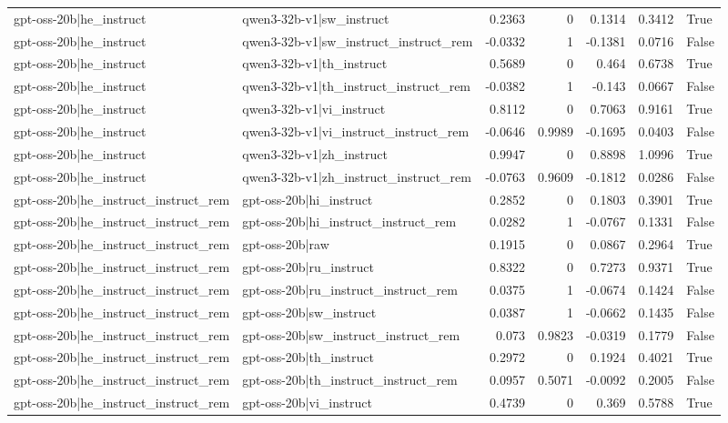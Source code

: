 \begin{table}
\begin{tabular}{l l r r r r l}
gpt-oss-20b|he_instruct & qwen3-32b-v1|sw_instruct & 0.2363 & 0 & 0.1314 & 0.3412 & True \\
gpt-oss-20b|he_instruct & qwen3-32b-v1|sw_instruct_instruct_rem & -0.0332 & 1 & -0.1381 & 0.0716 & False \\
gpt-oss-20b|he_instruct & qwen3-32b-v1|th_instruct & 0.5689 & 0 & 0.464 & 0.6738 & True \\
gpt-oss-20b|he_instruct & qwen3-32b-v1|th_instruct_instruct_rem & -0.0382 & 1 & -0.143 & 0.0667 & False \\
gpt-oss-20b|he_instruct & qwen3-32b-v1|vi_instruct & 0.8112 & 0 & 0.7063 & 0.9161 & True \\
gpt-oss-20b|he_instruct & qwen3-32b-v1|vi_instruct_instruct_rem & -0.0646 & 0.9989 & -0.1695 & 0.0403 & False \\
gpt-oss-20b|he_instruct & qwen3-32b-v1|zh_instruct & 0.9947 & 0 & 0.8898 & 1.0996 & True \\
gpt-oss-20b|he_instruct & qwen3-32b-v1|zh_instruct_instruct_rem & -0.0763 & 0.9609 & -0.1812 & 0.0286 & False \\
gpt-oss-20b|he_instruct_instruct_rem & gpt-oss-20b|hi_instruct & 0.2852 & 0 & 0.1803 & 0.3901 & True \\
gpt-oss-20b|he_instruct_instruct_rem & gpt-oss-20b|hi_instruct_instruct_rem & 0.0282 & 1 & -0.0767 & 0.1331 & False \\
gpt-oss-20b|he_instruct_instruct_rem & gpt-oss-20b|raw & 0.1915 & 0 & 0.0867 & 0.2964 & True \\
gpt-oss-20b|he_instruct_instruct_rem & gpt-oss-20b|ru_instruct & 0.8322 & 0 & 0.7273 & 0.9371 & True \\
gpt-oss-20b|he_instruct_instruct_rem & gpt-oss-20b|ru_instruct_instruct_rem & 0.0375 & 1 & -0.0674 & 0.1424 & False \\
gpt-oss-20b|he_instruct_instruct_rem & gpt-oss-20b|sw_instruct & 0.0387 & 1 & -0.0662 & 0.1435 & False \\
gpt-oss-20b|he_instruct_instruct_rem & gpt-oss-20b|sw_instruct_instruct_rem & 0.073 & 0.9823 & -0.0319 & 0.1779 & False \\
gpt-oss-20b|he_instruct_instruct_rem & gpt-oss-20b|th_instruct & 0.2972 & 0 & 0.1924 & 0.4021 & True \\
gpt-oss-20b|he_instruct_instruct_rem & gpt-oss-20b|th_instruct_instruct_rem & 0.0957 & 0.5071 & -0.0092 & 0.2005 & False \\
gpt-oss-20b|he_instruct_instruct_rem & gpt-oss-20b|vi_instruct & 0.4739 & 0 & 0.369 & 0.5788 & True \\

\end{tabular}
\end{table}
